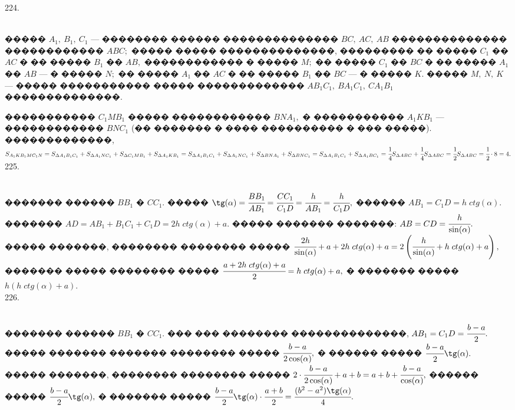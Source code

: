 \documentclass[12pt]{article}
\begin{document}
224. \begin{figure}[ht!]
\end{figure}\\
����� $A_1,\ B_1,\ C_1$ --- �������� ������ �������������� $BC,\ AC,\ AB$ �������������� ������������ $ABC;$ ����� ����� ��������������, ��������� �� ����� $C_1$ �� $AC$ � �� ����� $B_1$ �� $AB,$ ������������ � ����� $M;$ �� ����� $C_1$ �� $BC$ � �� ����� $A_1$ �� $AB$ --- � ����� $N;$ �� ����� $A_1$ �� $AC$ � �� ����� $B_1$ �� $BC$ --- � ����� $K.$ ����� $M,\ N,\ K$ --- ����� ����������� ����� ������������� $AB_1C_1,\ BA_1C_1,\ CA_1B_1$ ��������������.

����������� $C_1MB_1$ ����� ������������ $BNA_1,$ � ����������� $A_1KB_1$ --- ������������ $BNC_1$ (�� ������� � ���� ���������� � ��� �����). �������������,
$S_{A_1KB_1MC_1N} = S_{\Delta A_1B_1C_1} + S_{\Delta A_1NC_1} + S_{\Delta C_1MB_1} + S_{\Delta A_1KB_1}
= S_{\Delta A_1B_1C_1} + S_{\Delta A_1NC_1} + S_{\Delta BNA_1} + S_{\Delta BNC_1}
= S_{\Delta A_1B_1C_1} + S_{\Delta A_1BC_1} = \cfrac{1}{4}S_{\Delta ABC} + \cfrac{1}{4}S_{\Delta ABC} = \cfrac{1}{2}S_{\Delta ABC}=\cfrac{1}{2}\cdot 8=4.$\\
225. \begin{figure}[ht!]
\end{figure}\\
������� ������ $BB_1$ � $CC_1.$ ����� $\tg(\alpha)=\cfrac{BB_1}{AB_1}=\cfrac{CC_1}{C_1D}=\cfrac{h}{AB_1}=\cfrac{h}{C_1D},$ ������ $AB_1=C_1D=h\; ctg(\alpha).$ ������� $AD=AB_1+B_1C_1+C_1D=2h\; ctg(\alpha)+a.$ ����� ������� �������: $AB=CD=\cfrac{h}{\sin(\alpha)}.$ ����� �������, �������� �������� ����� $\cfrac{2h}{\sin(\alpha)}+a+2h\; ctg(\alpha)+a=2\left(\cfrac{h}{\sin(\alpha)}+h\; ctg(\alpha)+a\right),$ ������� ����� �������� ����� $\cfrac{a+2h\; ctg(\alpha)+a}{2}=h\; ctg(\alpha)+a,$ � ������� ����� $h(h\; ctg(\alpha)+a).$\\
226. \begin{figure}[ht!]
\end{figure}\\
������� ������ $BB_1$ � $CC_1.$ ��� ��� �������� ��������������, $AB_1=C_1D=\cfrac{b-a}{2}.$ ����� ������� ������� �������� ����� $\cfrac{b-a}{2\cos(\alpha)},$
� ������ ����� $\cfrac{b-a}{2}\tg(\alpha).$ ����� �������, �������� �������� ����� $2\cdot\cfrac{b-a}{2\cos(\alpha)}+a+b=a+b+\cfrac{b-a}{\cos(\alpha)},$ ������ ����� $\cfrac{b-a}{2}\tg(\alpha),$ � ������� ����� $\cfrac{b-a}{2}\tg(\alpha)\cdot\cfrac{a+b}{2}=\cfrac{(b^2-a^2)\tg(\alpha)}{4}.$\\
\end{document}
